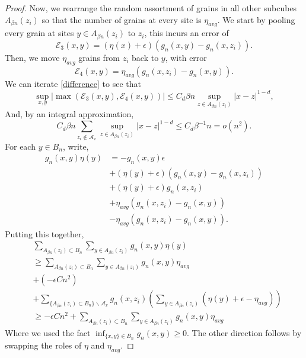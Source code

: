 \documentclass[12pt]{amsart}
\begin{document}
\begin{proof}
	 
 Now, we rearrange the random assortment of grains in all other subcubes $A_{\beta n}(z_i)$ so that the number of grains 
 at every site is $\eta_{avg}$. We start by pooling every grain at sites $y \in A_{\beta n}(z_i)$ 
 to $z_i$, this incurs an error of 
 \begin{equation}
 \mathcal{E}_3(x,y) = (\eta(x)+\epsilon) ( g_n(x,y) - g_n(x,z_i)).
 \end{equation}
 Then, we move $\eta_{avg}$ grains from $z_i$ back to $y$, with error
  \begin{equation}
 \mathcal{E}_4(x,y) = \eta_{avg} (g_n(x,z_i) - g_n(x,y)). 
 \end{equation}
 We can iterate \eqref{difference} to see that  
 \begin{equation} 
 \sup_{x,y} |\max(\mathcal{E}_3(x,y), \mathcal{E}_4(x,y))| \leq C_d \beta n \sup_{z \in A_{\beta n}(z_i)} |x-z|^{1-d}, 
 \end{equation} 
 And, by an integral approximation, 
 \begin{equation}
 C_d \beta n \sum_{z_i \not \in \mathcal{A}_x} \sup_{z \in A_{\beta n}(z_i) } |x-z|^{1-d} \leq C_d \beta^{-1} n = o(n^2).  
 \end{equation}
 For each $y \in B_n$, write,
 \begin{align*}
 g_n(x,y) \eta(y) &=  -g_n(x,y) \epsilon \\
 &+ (\eta(y) + \epsilon)(g_n(x,y) - g_n(x,z_i)) \\
 &+ (\eta(y) + \epsilon)  g_n(x,z_i) \\ 
 &+ \eta_{avg} (g_n(x,z_i) - g_n(x,y)) \\
 &- \eta_{avg} (g_n(x,z_i) - g_n(x,y)).  
 \end{align*}
 Putting this together, 
  \begin{align*}
   &\sum_{A_{\beta n}(z_i) \subset B_{n}} \sum_{y \in A_{\beta n}(z_i)} g_{n}(x,y) \eta(y) \\
   &\geq \sum_{A_{\beta n}(z_i) \subset B_{n}} \sum_{y \in A_{\beta n}(z_i)} g_{n}(x,y) \eta_{avg} \\
   &+ (-\epsilon C n^2)  \\
   &+ \sum_{ \{ A_{\beta n}(z_i) \subset B_{n}\} \backslash \mathcal{A}_x} g_n(x,z_i) \left( \sum_{y \in A_{\beta n}(z_i)}  (\eta(y) + \epsilon - \eta_{avg}) \right)  \\
   &\geq -\epsilon C n^2 + \sum_{A_{\beta n}(z_i) \subset B_{n}} \sum_{y \in A_{\beta n}(z_i)} g_{n}(x,y) \eta_{avg}
   \end{align*}
   Where we used the fact $\inf_{ \{x,y\} \in B_n } g_n(x,y) \geq 0$. The other direction follows by swapping the roles of $\eta$ and $\eta_{avg}$. 
 
 
  
\end{proof} 
\end{document}
